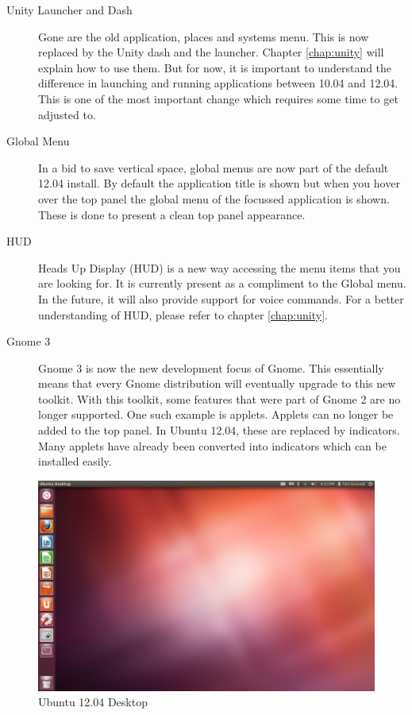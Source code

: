 \begin{description}
	\item [Unity Launcher and Dash] Gone are the old application, places and systems menu. This is now replaced by the Unity dash and the launcher. Chapter \ref{chap:unity} will explain how to use them. But for now, it is important to understand the difference in launching and running applications between 10.04 and 12.04. This is one of the most important change which requires some time to get adjusted to.
	
	\item [Global Menu] In a bid to save vertical space, global menus are now part of the default 12.04 install. By default the application title is shown but when you hover over the top panel the global menu of the focussed application is shown. These is done to present a clean top panel appearance. 
		
	\item [HUD] Heads Up Display (HUD) is a new way accessing the menu items that you are looking for. It is currently present as a compliment to the Global menu. In the future, it will also provide support for voice commands. For a better understanding of HUD, please refer to chapter \ref{chap:unity}.

	\item [Gnome 3] Gnome 3 is now the new development focus of Gnome. This essentially means that every Gnome distribution will eventually upgrade to this new toolkit. With this toolkit, some features that were part of Gnome 2 are no longer supported. One such example is applets. Applets can no longer be added to the top panel. In Ubuntu 12.04, these are replaced by indicators. Many applets have already been converted into indicators which can be installed easily.	
\end{description}

\begin{figure}[h!]	
	\centering
	\includegraphics[width=400pt]{./images/ubuntu12-04.png}
	\caption{Ubuntu 12.04 Desktop}	
	\label{fig:ubuntu12.04}		
\end{figure}
